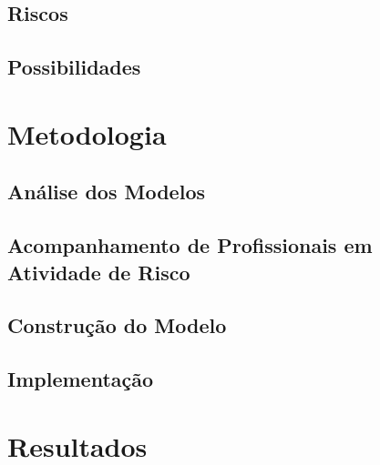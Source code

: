 \documentclass[openright]{normas-utf-tex} %
\begin{document}
	\section{Riscos}

		

	\section{Possibilidades}

		

\chapter{Metodologia}
\label{chap:metod}

	

	\section{Análise dos Modelos}

		

	\section{Acompanhamento de Profissionais em Atividade de Risco}

		

	\section{Construção do Modelo}

		

	\section{Implementação}

		

\chapter{Resultados}
\label{chap:resul}

	
	
\end{document}
